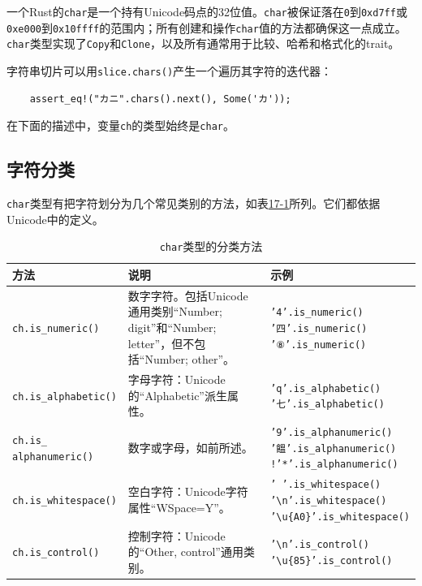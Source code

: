 一个Rust的\texttt{char}是一个持有Unicode码点的32位值。\texttt{char}被保证落在\texttt{0}到\texttt{0xd7ff}或\texttt{0xe000}到\texttt{0x10ffff}的范围内；所有创建和操作\texttt{char}值的方法都确保这一点成立。\texttt{char}类型实现了\texttt{Copy}和\texttt{Clone}，以及所有通常用于比较、哈希和格式化的trait。

字符串切片可以用\texttt{slice.chars()}产生一个遍历其字符的迭代器：
\begin{verbatim}
    assert_eq!("カニ".chars().next(), Some('カ'));
\end{verbatim}

在下面的描述中，变量\texttt{ch}的类型始终是\texttt{char}。

\subsection{字符分类}

\texttt{char}类型有把字符划分为几个常见类别的方法，如表\hyperref[t17-1]{17-1}所列。它们都依据Unicode中的定义。

\begin{longtable}{p{}p{}p{}}
    \caption{\texttt{char}类型的分类方法}
    \label{t17-1}\\
    \hline
    \textbf{方法} & \textbf{说明} & \textbf{示例} \\
    \hline
    \texttt{ch.is\_numeric()} & 数字字符。包括Unicode通用类别“Number; digit”和“Number; letter”，但不包括“Number; other”。 &
    \makecell[l]{\texttt{'4'.is\_numeric()}\\ \texttt{'四'.is\_numeric()}\\ \texttt{'⑧'.is\_numeric()}} \\
    \hline
    \rowcolor{tablecolor}
    \texttt{ch.is\_alphabetic()} & 字母字符：Unicode的“Alphabetic”派生属性。 &
    \makecell[l]{\texttt{'q'.is\_alphabetic()}\\ \texttt{'七'.is\_alphabetic()}} \\
    \hline
    \makecell[l]{\texttt{ch.is\_}\\ \texttt{alphanumeric()}} & 数字或字母，如前所述。 &
    \makecell[l]{\texttt{'9'.is\_alphanumeric()}\\ \texttt{'饂'.is\_alphanumeric()}\\ \texttt{!'*'.is\_alphanumeric()}} \\
    \hline
    \rowcolor{tablecolor}
    \texttt{ch.is\_whitespace()} & 空白字符：Unicode字符属性“WSpace=Y”。 &
    \makecell[l]{\texttt{' '.is\_whitespace()}\\ \texttt{'\textbackslash n'.is\_whitespace()}\\ \texttt{'\textbackslash u\{A0\}'.is\_whitespace()}} \\
    \hline
    \texttt{ch.is\_control()} & 控制字符：Unicode的“Other, control”通用类别。 &
    \makecell[l]{\texttt{'\textbackslash n'.is\_control()}\\ \texttt{'\textbackslash u\{85\}'.is\_control()}} \\
    \hline
\end{longtable}

